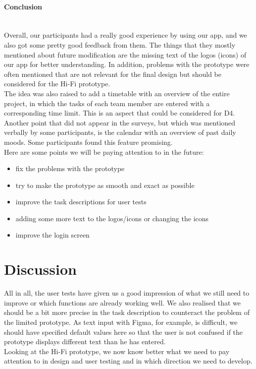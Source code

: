\documentclass[11pt]{article}
\begin{document}
\paragraph{Conclusion} \mbox{}\\
Overall, our participants had a really good experience by using our app, and we also got some pretty good feedback from them. The things that they mostly mentioned about future modification are the missing text of the logos (icons) of our app for better understanding. In addition, problems with the prototype were often mentioned that are not relevant for the final design but should be considered for the Hi-Fi prototype.\\
The idea was also raised to add a timetable with an overview of the entire project, in which the tasks of each team member are entered with a corresponding time limit. This is an aspect that could be considered for D4. Another point that did not appear in the surveys, but which was mentioned verbally by some participants, is the calendar with an overview of past daily moods. Some participants found this feature promising.\\

Here are some points we will be paying attention to in the future:
\begin{itemize}
    \item fix the problems with the prototype
    \item try to make the prototype as smooth and exact as possible
    \item improve the task descriptions for user tests
    \item adding some more text to the logos/icons or changing the icons
    \item improve the login screen
\end{itemize}



\section{Discussion}
All in all, the user tests have given us a good impression of what we still need to improve or which functions are already working well. We also realised that we should be a bit more precise in the task description to counteract the problem of the limited prototype. As text input with Figma, for example, is difficult, we should have specified default values here so that the user is not confused if the prototype displays different text than he has entered.\\
Looking at the Hi-Fi prototype, we now know better what we need to pay attention to in design and user testing and in which direction we need to develop.


\printbibliography

\end{document}
